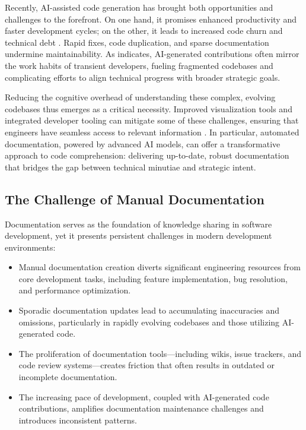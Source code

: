 \documentclass[12pt,oneside]{article}
\begin{document}
Recently, AI-assisted code generation has brought both opportunities and challenges to the forefront. On one hand, 
it promises enhanced productivity and faster development cycles; on the other, it leads to increased code churn and 
technical debt \textcite{pandi2023}. Rapid fixes, code duplication, and sparse documentation undermine maintainability. 
As \textcite{gitclear2024} indicates, AI-generated contributions often mirror the work habits of transient developers, 
fueling fragmented codebases and complicating efforts to align technical progress with broader strategic goals.

Reducing the cognitive overhead of understanding these complex, evolving codebases thus emerges as a critical 
necessity. Improved visualization tools and integrated developer tooling can mitigate some of these challenges, 
ensuring that engineers have seamless access to relevant information \textcite{meyer2021today}. In particular, 
automated documentation, powered by advanced AI models, can offer a transformative approach to code comprehension: 
delivering up-to-date, robust documentation that bridges the gap between technical minutiae and strategic intent.

\subsection{The Challenge of Manual Documentation}

Documentation serves as the foundation of knowledge sharing in software development, yet it 
presents persistent challenges in modern development environments:

\begin{itemize}
    \item Manual documentation creation diverts significant engineering resources from core development tasks, including feature implementation, bug resolution, and performance optimization.
    \item Sporadic documentation updates lead to accumulating inaccuracies and omissions, particularly in rapidly evolving codebases and those utilizing AI-generated code.
    \item The proliferation of documentation tools—including wikis, issue trackers, and code review systems—creates friction that often results in outdated or incomplete documentation.
    \item The increasing pace of development, coupled with AI-generated code contributions, amplifies documentation maintenance challenges and introduces inconsistent patterns.
\end{itemize}
\end{document}
